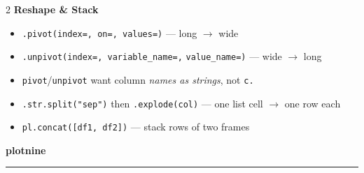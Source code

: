\documentclass[11pt, a4paper]{article}
\newcommand{\code}[1]{\textcolor{codecolor}{\texttt{#1}}}
\newcommand{\head}[1]{\smallskip\textbf{#1}\par\smallskip}
\newcommand{\bighead}[1]{{\large\textbf{#1}}\par\smallskip\hrule\medskip}
\begin{document}
\begin{multicols}{2}
\head{Reshape \& Stack}
\begin{itemize}
  \item \code{.pivot(index=, on=, values=)} --- long $\to$ wide
  \item \code{.unpivot(index=, variable\_name=,} \code{value\_name=)} --- wide $\to$ long
  \item \code{pivot}/\code{unpivot} want column \emph{names as strings}, not \code{c.}
  \item \code{.str.split("sep")} then \code{.explode(col)} --- one list cell $\to$ one row each
  \item \code{pl.concat([df1, df2])} --- stack rows of two frames
\end{itemize}

\end{multicols}

\bighead{plotnine}
\end{document}
